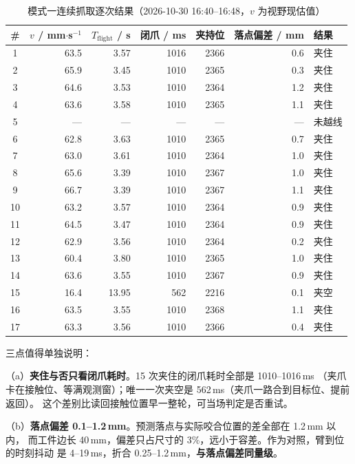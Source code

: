 \documentclass[UTF8,a4paper,zihao=5,fontset=windows]{ctexart}
\begin{document}
\begin{table}[H]\centering\scriptsize
\caption{模式一连续抓取逐次结果（2026-10-30 16:40--16:48，$v$ 为视野现估值）}
\label{tab:dyn}
\begin{tabular}{@{}crrrrrl@{}}
\toprule
\# & $v$ / mm$\cdot$s$^{-1}$ & $T_{\text{flight}}$ / s & 闭爪 / ms & 夹持位 & 落点偏差 / mm & 结果 \\
\midrule
1 & 63.5 & 3.57 & 1016 & 2366 & 0.6 & 夹住 \\
2 & 65.9 & 3.45 & 1010 & 2365 & 0.3 & 夹住 \\
3 & 64.6 & 3.53 & 1010 & 2364 & 1.2 & 夹住 \\
4 & 63.6 & 3.58 & 1010 & 2365 & 1.1 & 夹住 \\
5 & --- & --- & --- & --- & --- & 未越线 \\
6 & 62.8 & 3.63 & 1010 & 2365 & 0.7 & 夹住 \\
7 & 63.0 & 3.61 & 1010 & 2364 & 1.0 & 夹住 \\
8 & 65.6 & 3.39 & 1010 & 2367 & 1.0 & 夹住 \\
9 & 66.7 & 3.39 & 1010 & 2367 & 1.1 & 夹住 \\
10 & 63.2 & 3.57 & 1010 & 2364 & 0.9 & 夹住 \\
11 & 64.5 & 3.47 & 1010 & 2364 & 0.9 & 夹住 \\
12 & 62.9 & 3.56 & 1010 & 2364 & 0.2 & 夹住 \\
13 & 60.4 & 3.80 & 1010 & 2365 & 1.0 & 夹住 \\
14 & 63.6 & 3.55 & 1010 & 2367 & 0.9 & 夹住 \\
15 & 16.4 & 13.95 & 562 & 2216 & 0.1 & 夹空 \\
16 & 63.5 & 3.55 & 1010 & 2368 & 1.1 & 夹住 \\
17 & 63.3 & 3.56 & 1010 & 2366 & 0.4 & 夹住 \\
\bottomrule
\end{tabular}
\end{table}


三点值得单独说明：

（a）\textbf{夹住与否只看闭爪耗时}。15 次夹住的闭爪耗时全部是 1010--1016\,ms
（夹爪卡在接触位、等满观测窗）；唯一一次夹空是 562\,ms（夹爪一路合到目标位、提前返回）。
这个差别比读回接触位置早一整轮，可当场判定是否重试。

（b）\textbf{落点偏差 0.1--1.2\,mm}。预测落点与实际咬合位置的差全部在 1.2\,mm 以内，
而工件边长 40\,mm，偏差只占尺寸的 3\%，远小于容差。作为对照，臂到位的时刻抖动
是 4--19\,ms，折合 0.25--1.2\,mm，\textbf{与落点偏差同量级}。
\end{document}
